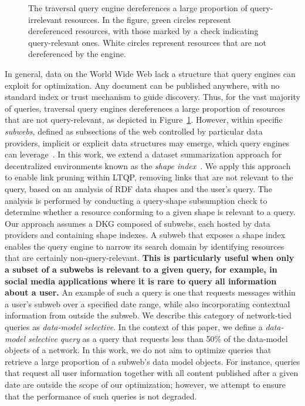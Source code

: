 \begin{figure}
    \centering
    
    \caption{
    The traversal query engine dereferences a large proportion of query-irrelevant resources. 
    In the figure, green circles represent dereferenced resources, with those marked by a check indicating query-relevant ones. 
    White circles represent resources that are not dereferenced by the engine.
    }
    \label{fig:situation}
\end{figure}

In general, data on the World Wide Web lack a structure that query engines can exploit for optimization.  
Any document can be published anywhere, with no standard index or trust mechanism to guide discovery.
Thus, for the vast majority of queries, traversal query engines dereferences a large proportion of resources that are not query-relevant, as depicted in Figure~\ref{fig:situation}.
However, within specific \emph{subwebs}, defined as subsections of the web controlled by particular data providers, implicit or explicit data structures may emerge, which query engines can leverage~\cite{Bogaerts2021LinkTW}.
In this work, we extend a dataset summarization approach for decentralized environments known as the \emph{shape index}~\cite{tam2024opportunitiesshapebasedoptimizationlink}.
We apply this approach to enable link pruning within LTQP, removing links that are not relevant to the query, based on an analysis of RDF data shapes and the user's query.
The analysis is performed by conducting a query-shape subsumption check to determine whether a resource conforming to a given shape is relevant to a query.
Our approach assumes a DKG composed of subwebs, each hosted by data providers and containing shape indexes.
A subweb that exposes a shape index enables the query engine to narrow its search domain by identifying resources that are certainly non-query-relevant.
\textbf{This is particularly useful when only a subset of a subwebs is relevant to a given query, for example, in social media applications where it is rare to query all information about a user.}
An example of such a query is one that requests messages within a user's subweb over a specified date range, while also incorporating contextual information from outside the subweb.
We describe this category of network-tied queries as \emph{data-model selective}.
In the context of this paper, we define a \emph{data-model selective query} as a query that requests less than 50\% of the data-model objects of a network.
In this work, we do not aim to optimize queries that retrieve a large proportion of a subweb's data model objects.  
For instance, queries that request all user information together with all content published after a given date are outside the scope of our optimization; however, we attempt to ensure that the performance of such queries is not degraded.  


